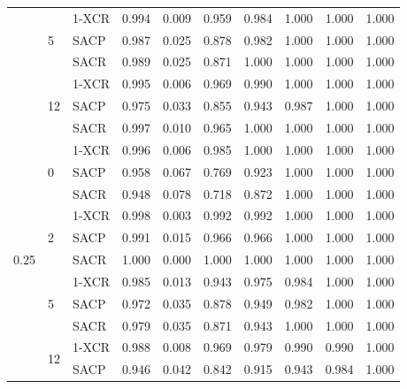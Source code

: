 \begin{longtable}[c]{@{}llllllllll@{}}
                        & \multirow{3}{*}{5}  & 1-XCR  & 0.994 & 0.009 & 0.959 & 0.984 & 1.000 & 1.000 & 1.000 \\
                        &                     & SACP   & 0.987 & 0.025 & 0.878 & 0.982 & 1.000 & 1.000 & 1.000 \\
                        &                     & SACR   & 0.989 & 0.025 & 0.871 & 1.000 & 1.000 & 1.000 & 1.000 \\* \cmidrule(l){3-10} 
                        & \multirow{3}{*}{12} & 1-XCR  & 0.995 & 0.006 & 0.969 & 0.990 & 1.000 & 1.000 & 1.000 \\
                        &                     & SACP   & 0.975 & 0.033 & 0.855 & 0.943 & 0.987 & 1.000 & 1.000 \\
                        &                     & SACR   & 0.997 & 0.010 & 0.965 & 1.000 & 1.000 & 1.000 & 1.000 \\* \cmidrule(l){2-10} 
\multirow{12}{*}{0.25} & \multirow{3}{*}{0}  & 1-XCR  & 0.996 & 0.006 & 0.985 & 1.000 & 1.000 & 1.000 & 1.000 \\
                        &                     & SACP   & 0.958 & 0.067 & 0.769 & 0.923 & 1.000 & 1.000 & 1.000 \\
                        &                     & SACR   & 0.948 & 0.078 & 0.718 & 0.872 & 1.000 & 1.000 & 1.000 \\* \cmidrule(l){3-10} 
                        & \multirow{3}{*}{2}  & 1-XCR  & 0.998 & 0.003 & 0.992 & 0.992 & 1.000 & 1.000 & 1.000 \\
                        &                     & SACP   & 0.991 & 0.015 & 0.966 & 0.966 & 1.000 & 1.000 & 1.000 \\
                        &                     & SACR   & 1.000 & 0.000 & 1.000 & 1.000 & 1.000 & 1.000 & 1.000 \\* \cmidrule(l){3-10} 
                        & \multirow{3}{*}{5}  & 1-XCR  & 0.985 & 0.013 & 0.943 & 0.975 & 0.984 & 1.000 & 1.000 \\
                        &                     & SACP   & 0.972 & 0.035 & 0.878 & 0.949 & 0.982 & 1.000 & 1.000 \\
                        &                     & SACR   & 0.979 & 0.035 & 0.871 & 0.943 & 1.000 & 1.000 & 1.000 \\* \cmidrule(l){3-10} 
                        & \multirow{3}{*}{12} & 1-XCR  & 0.988 & 0.008 & 0.969 & 0.979 & 0.990 & 0.990 & 1.000 \\
                        &                     & SACP   & 0.946 & 0.042 & 0.842 & 0.915 & 0.943 & 0.984 & 1.000 \\

\end{longtable}
